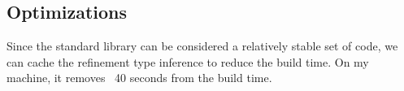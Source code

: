 \subsection{Optimizations}

Since the standard library can be considered a relatively stable set of code, we can cache the refinement type inference to reduce the build time.
On my machine, it removes ~40 seconds from the build time.